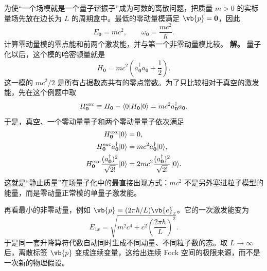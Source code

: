 \begin{exbox}[把一个场模真的当作谐振子来算]
为使“一个场模就是一个量子谐振子”成为可数的离散问题，把质量 $m>0$ 的实标量场先放在边长为 $L$ 的周期盒中。最低的零动量模满足 $\vb{p}=\mathbf0$，因此
\begin{equation*}
 E_{\mathbf0}=mc^2,
 \qquad
 \omega_{\mathbf0}=\frac{mc^2}{\hbar}.
\end{equation*}
计算零动量模的零点能和前两个激发能，并与第一个非零动量模比较。
\textbf{解。} 量子化以后，这个模的哈密顿量就是
\begin{equation*}
 H_{\mathbf0}=mc^2\left(a_{\mathbf0}^\dagger a_{\mathbf0}+\frac12\right).
\end{equation*}
这一模的 $mc^2/2$ 是所有占据数态共有的零点常数。为了只比较相对于真空的激发能，先在这个例题中取
\begin{equation*}
 H_{\mathbf0}^{\rm exc}
 \equiv H_{\mathbf0}-\langle0|H_{\mathbf0}|0\rangle
 =mc^2a_{\mathbf0}^\dagger a_{\mathbf0}.
\end{equation*}
于是，真空、一个零动量量子和两个零动量量子依次满足
\begin{align*}
 H_{\mathbf0}^{\rm exc}|0\rangle&=0,\\
 H_{\mathbf0}^{\rm exc}a_{\mathbf0}^\dagger|0\rangle
 &=mc^2a_{\mathbf0}^\dagger|0\rangle,\\
 H_{\mathbf0}^{\rm exc}\frac{(a_{\mathbf0}^\dagger)^2}{\sqrt{2!}}|0\rangle
 &=2mc^2\frac{(a_{\mathbf0}^\dagger)^2}{\sqrt{2!}}|0\rangle.
\end{align*}
这就是“静止质量”在场量子化中的最直接出现方式：$mc^2$ 不是另外塞进粒子模型的能量，而是零动量正常模的单量子激发能。

再看最小的非零动量，例如 $\vb{p}=(2\pi\hbar/L)\vb{e}_x$。它的一次激发能变为
\begin{equation*}
 E_{1x}=\sqrt{m^2c^4+c^2\left(\frac{2\pi\hbar}{L}\right)^2}.
\end{equation*}
于是同一套升降算符代数自动同时生成不同动量、不同粒子数的态。取 $L\to\infty$ 后，离散标签 $\vb{p}$ 变成连续变量，这给出连续 Fock 空间的极限来源，而不是一次新的物理假设。
\end{exbox}

